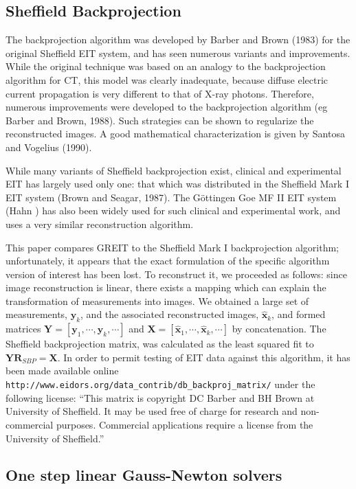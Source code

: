 \documentclass[12pt]{iopart}
\newcommand{\xH}{\mbox{$\mathbf{\hat x}$}}
\newcommand{\yB}{\mbox{$\mathbf{y}$}}
\newcommand{\RB}{\mbox{$\mathbf{R}$}}
\newcommand{\XB}{\mbox{$\mathbf{X}$}}
\newcommand{\YB}{\mbox{$\mathbf{Y}$}}
\begin{document}
\subsection{Sheffield Backprojection}

The backprojection algorithm was developed by 
Barber and Brown (1983) for the original 
Sheffield EIT system, and  has seen numerous 
variants and improvements. While the original
technique was based on an analogy to the backprojection
algorithm for CT, this model was clearly inadequate, because
diffuse electric current propagation is very different
to that of X-ray photons. Therefore, numerous improvements
were developed to the backprojection algorithm
(eg Barber and Brown, 1988). Such strategies
can be shown to regularize the reconstructed images.
A good mathematical characterization is given by
Santosa and Vogelius (1990).

While many variants of Sheffield backprojection exist,
clinical and experimental EIT has largely used only
one: that which was distributed in the
Sheffield Mark I EIT system (Brown and Seagar, 1987).
The G\"ottingen Goe MF II EIT system (Hahn )
has also been widely used for such clinical and
experimental work, and uses a very similar reconstruction
algorithm.

This paper compares GREIT to the Sheffield Mark I
backprojection algorithm;
unfortunately, it appears that the exact formulation
of the specific algorithm version of interest has been
lost. To reconstruct it, we proceeded as follows:
since image reconstruction is linear, there exists
a mapping which can explain the transformation of
measurements into images. We obtained a large set of
measurements, $\yB_k$, and the associated
reconstructed images, $\xH_k$, and formed matrices
$\YB = [ \yB_1, \cdots, \yB_k, \cdots]$ and 
$\XB = [ \xH_1, \cdots, \xH_k, \cdots]$ by concatenation.
The Sheffield backprojection matrix, was
calculated as the least squared fit to
   $\YB \RB_{SBP} = \XB$.
In order to permit testing of EIT data against
this algorithm, it has been made available
online 
\verb$http://www.eidors.org/data_contrib/db_backproj_matrix/$
under the following license:
``This matrix is copyright DC Barber and BH Brown at
  University of Sheffield. It may be used free of charge
  for research and non-commercial purposes. Commercial
  applications require a license from the University of Sheffield.''


\subsection{One step linear Gauss-Newton solvers}
\label{subsec:OSLGNS}
\end{document}
